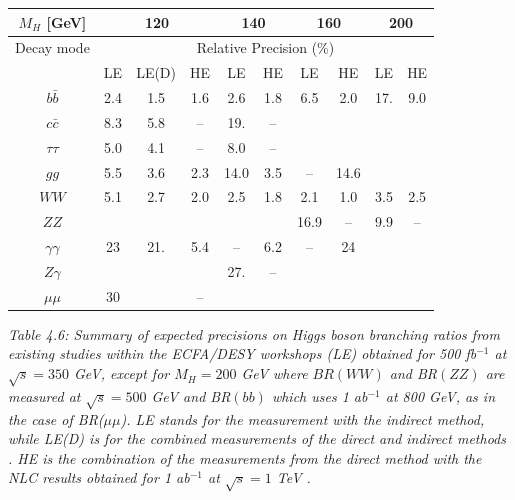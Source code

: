 \begin{table}[hbt]
\renewcommand{\arraystretch}{1.2}
\begin{center}
\begin{tabular}{|c|ccc|cc|cc|cc|}
\hline
$M_H$ [GeV] &  \multicolumn{3}{c|}{120}&  \multicolumn{2}{c|}{140}& 
 \multicolumn{2}{c|}{160}     &  \multicolumn{2}{c|}{200} \\ \hline
Decay mode  & \multicolumn{9}{c|}{Relative Precision (\%)} \\ 
            &LE &LE(D)&  HE & LE  & HE  & LE  & HE   &  LE  & HE\\ \hline
$b\bar b$   &2.4 &1.5 & 1.6 & 2.6 & 1.8 & 6.5 & 2.0  & 17.  & 9.0 \\
$c\bar c$   &8.3& 5.8 & --  & 19. & --  &     &      &      &    \\
$\tau\tau$  &5.0&4.1 & --  & 8.0 & --  &     &      &      &     \\ \hline
$gg$        &5.5&3.6 & 2.3 & 14.0& 3.5 &  -- & 14.6 &      &      \\
$WW$        &5.1& 2.7 & 2.0 & 2.5 & 1.8 & 2.1 & 1.0  &  3.5 &2.5    \\
$ZZ$        &  &   &     &     &     & 16.9& --   &  9.9 & --    \\ \hline 
$\gamma\gamma$&23& 21.& 5.4 & --  & 6.2 &  -- & 24   &      &       \\
$Z\gamma$   &  &   &     &27.  & --  &     &      &      &       \\
$\mu\mu$    &  30 & & -- &     &     &     &       &      & \\ \hline
\end{tabular}
\end{center}
\vspace*{-1mm}
{\it Table 4.6: Summary of expected precisions on Higgs boson branching ratios 
from existing studies within the ECFA/DESY workshops (LE) \cite{Desch} 
obtained for 500 fb$^{-1}$ at $\sqrt{s}=350$ GeV, except for $M_H=200$ GeV 
where $BR(WW)$ and BR$(ZZ)$ are measured at $\sqrt{s}=500$ GeV and BR$(bb)$ 
which uses 1 ab$^{-1}$ at 800 GeV, as in the case of BR($\mu \mu$).
LE stands for the measurement with the indirect method, while LE(D) is for the 
combined measurements of the direct and indirect methods \cite{Brient}. HE is 
the combination of the measurements from the direct method with the NLC 
results obtained for 1 ab$^{-1}$ at $\sqrt{s}=1$ TeV \cite{Barklow}.}
\vspace*{-2mm}
\end{table}

